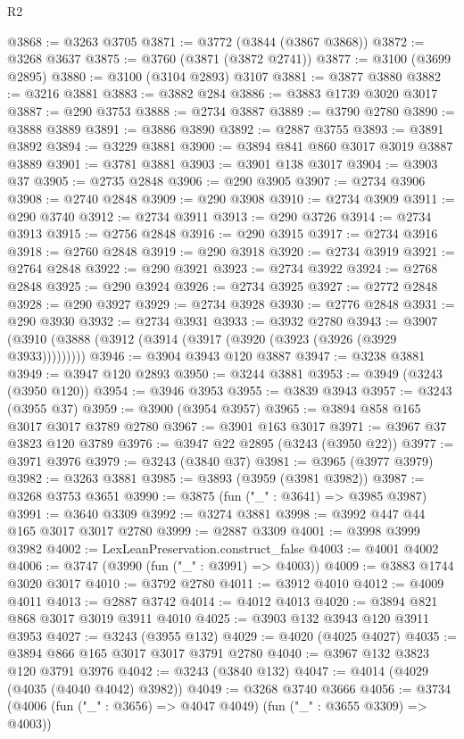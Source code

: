 \begin{lexlean}{R2}
\begin{coremodule}
@3868 := @3263 @3705
@3871 := @3772 (@3844 (@3867 @3868))
@3872 := @3268 @3637
@3875 := @3760 (@3871 (@3872 @2741))
@3877 := @3100 (@3699 @2895)
@3880 := @3100 (@3104 @2893) @3107
@3881 := @3877 @3880
@3882 := @3216 @3881
@3883 := @3882 @284
@3886 := @3883 @1739 @3020 @3017
@3887 := @290 @3753
@3888 := @2734 @3887
@3889 := @3790 @2780
@3890 := @3888 @3889
@3891 := @3886 @3890
@3892 := @2887 @3755
@3893 := @3891 @3892
@3894 := @3229 @3881
@3900 := @3894 @841 @860 @3017 @3019 @3887 @3889
@3901 := @3781 @3881
@3903 := @3901 @138 @3017
@3904 := @3903 @37
@3905 := @2735 @2848
@3906 := @290 @3905
@3907 := @2734 @3906
@3908 := @2740 @2848
@3909 := @290 @3908
@3910 := @2734 @3909
@3911 := @290 @3740
@3912 := @2734 @3911
@3913 := @290 @3726
@3914 := @2734 @3913
@3915 := @2756 @2848
@3916 := @290 @3915
@3917 := @2734 @3916
@3918 := @2760 @2848
@3919 := @290 @3918
@3920 := @2734 @3919
@3921 := @2764 @2848
@3922 := @290 @3921
@3923 := @2734 @3922
@3924 := @2768 @2848
@3925 := @290 @3924
@3926 := @2734 @3925
@3927 := @2772 @2848
@3928 := @290 @3927
@3929 := @2734 @3928
@3930 := @2776 @2848
@3931 := @290 @3930
@3932 := @2734 @3931
@3933 := @3932 @2780
@3943 := @3907 (@3910 (@3888 (@3912 (@3914 (@3917 (@3920 (@3923 (@3926 (@3929 @3933)))))))))
@3946 := @3904 @3943 @120 @3887
@3947 := @3238 @3881
@3949 := @3947 @120 @2893
@3950 := @3244 @3881
@3953 := @3949 (@3243 (@3950 @120))
@3954 := @3946 @3953
@3955 := @3839 @3943
@3957 := @3243 (@3955 @37)
@3959 := @3900 (@3954 @3957)
@3965 := @3894 @858 @165 @3017 @3017 @3789 @2780
@3967 := @3901 @163 @3017
@3971 := @3967 @37 @3823 @120 @3789
@3976 := @3947 @22 @2895 (@3243 (@3950 @22))
@3977 := @3971 @3976
@3979 := @3243 (@3840 @37)
@3981 := @3965 (@3977 @3979)
@3982 := @3263 @3881
@3985 := @3893 (@3959 (@3981 @3982))
@3987 := @3268 @3753 @3651
@3990 := @3875 (fun ("_" : @3641) => @3985 @3987)
@3991 := @3640 @3309
@3992 := @3274 @3881
@3998 := @3992 @447 @44 @165 @3017 @3017 @2780
@3999 := @2887 @3309
@4001 := @3998 @3999 @3982
@4002 := LexLeanPreservation.construct_false
@4003 := @4001 @4002
@4006 := @3747 (@3990 (fun ("_" : @3991) => @4003))
@4009 := @3883 @1744 @3020 @3017
@4010 := @3792 @2780
@4011 := @3912 @4010
@4012 := @4009 @4011
@4013 := @2887 @3742
@4014 := @4012 @4013
@4020 := @3894 @821 @868 @3017 @3019 @3911 @4010
@4025 := @3903 @132 @3943 @120 @3911 @3953
@4027 := @3243 (@3955 @132)
@4029 := @4020 (@4025 @4027)
@4035 := @3894 @866 @165 @3017 @3017 @3791 @2780
@4040 := @3967 @132 @3823 @120 @3791 @3976
@4042 := @3243 (@3840 @132)
@4047 := @4014 (@4029 (@4035 (@4040 @4042) @3982))
@4049 := @3268 @3740 @3666
@4056 := @3734 (@4006 (fun ("_" : @3656) => @4047 @4049) (fun ("_" : @3655 @3309) => @4003))

\end{coremodule}
\end{lexlean}
